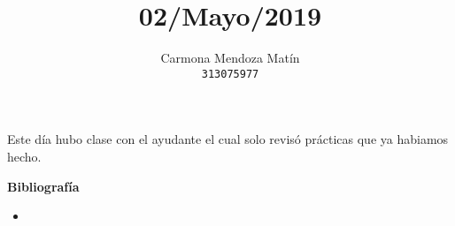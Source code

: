 \documentclass[11pt, a4paper]{report}
\begin{document}
\title{02/Mayo/2019}
\author{
  Carmona Mendoza Mat\'in\\
  \texttt{313075977}
}
\date{}
\maketitle

Este día hubo clase con el ayudante el cual solo revisó prácticas que ya
habiamos hecho.

\newpage

\textbf{Bibliografía} \\

\begin{itemize}

\item \url{}


\end{itemize}
\end{document}

